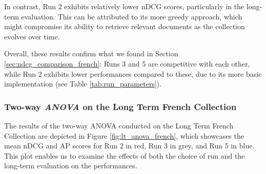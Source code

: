 In contrast, Run 2 exhibits relatively lower \ac{nDCG} scores, particularly in the long-term evaluation. This can be attributed to its more greedy approach, which might compromise its ability to retrieve relevant documents as the collection evolves over time.

Overall, these results confirm what we found in Section \ref{sec:ndcg_comparison_french}: Runs 3 and 5 are competitive with each other, while Run 2 exhibits lower performances compared to these, due to its more basic implementation (see Table \ref{tab:run_parameters}). 


\subsubsection{Two-way \textit{ANOVA} on the Long Term French Collection} \label{sec:anova_fr_lt}

The results of the two-way \ac{ANOVA} conducted on the Long Term French Collection are depicted in Figure \ref{fig:lt_anova_french}, which showcases the mean \ac{nDCG} and \ac{AP} scores for Run 2 in red, Run 3 in grey, and Run 5 in blue. 
This plot enables us to examine the effects of both the choice of run and the long-term evaluation on the performances.


